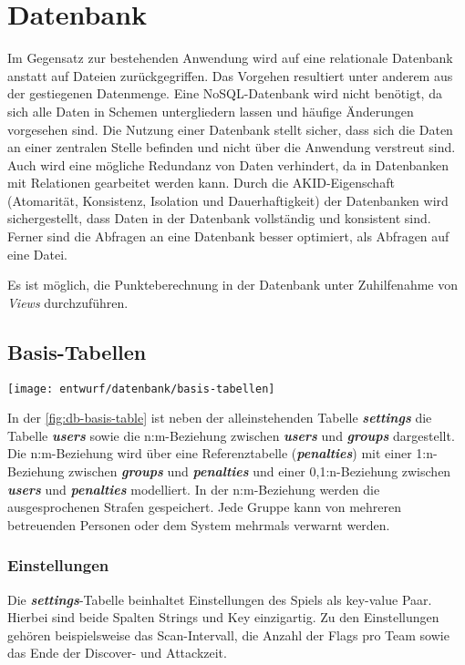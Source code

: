 \section{Datenbank}
\label{sec:Entwurf-Datenbank}
Im Gegensatz zur bestehenden Anwendung wird auf eine relationale Datenbank anstatt auf Dateien zurückgegriffen. Das Vorgehen resultiert unter anderem aus der gestiegenen Datenmenge. Eine NoSQL-Datenbank wird nicht benötigt, da sich alle Daten in Schemen untergliedern lassen und häufige Änderungen vorgesehen sind. Die Nutzung einer Datenbank stellt sicher, dass sich die Daten an einer zentralen Stelle befinden und nicht über die Anwendung verstreut sind. Auch wird eine mögliche Redundanz von Daten verhindert, da in Datenbanken mit Relationen gearbeitet werden kann. Durch die AKID-Eigenschaft (Atomarität, Konsistenz, Isolation und Dauerhaftigkeit) der Datenbanken wird sichergestellt, dass Daten in der Datenbank vollständig und konsistent sind. Ferner sind die Abfragen an eine Datenbank besser optimiert, als Abfragen auf eine Datei. \cite{drillingWasIstDatenbank2017}

Es ist möglich, die Punkteberechnung in der Datenbank unter Zuhilfenahme von \textit{Views} durchzuführen.

\subsection{Basis-Tabellen}
\begin{center}
	\texttt{[image: entwurf/datenbank/basis-tabellen]}
	\label{fig:db-basis-table}
\end{center}

In der \autoref{fig:db-basis-table} ist neben der alleinstehenden Tabelle \textbf{\textit{settings}} die Tabelle \textbf{\textit{users}} sowie die n:m-Beziehung  zwischen \textbf{\textit{users}} und \textbf{\textit{groups}} dargestellt. Die  n:m-Beziehung wird über eine Referenztabelle (\textbf{\textit{penalties}}) mit einer 1:n-Beziehung zwischen \textbf{\textit{groups}} und \textbf{\textit{penalties}} und einer 0,1:n-Beziehung zwischen \textbf{\textit{users}} und \textbf{\textit{penalties}} modelliert. In der n:m-Beziehung werden die ausgesprochenen Strafen gespeichert. Jede Gruppe kann von mehreren betreuenden Personen oder dem System mehrmals verwarnt werden.

\subsubsection{Einstellungen}
Die \textbf{\textit{settings}}-Tabelle beinhaltet Einstellungen des Spiels als key-value Paar. Hierbei sind beide Spalten Strings und Key einzigartig. Zu den Einstellungen gehören beispielsweise das Scan-Intervall, die Anzahl der Flags pro Team sowie das Ende der Discover- und Attackzeit.

